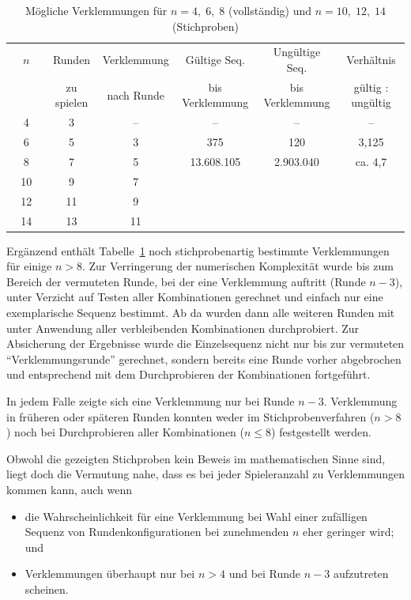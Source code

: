 \documentclass[DIV=15, 10pt]{scrartcl}
\begin{document}
\begin{table}[htbp]
\begin{center}
\begin{tabular}{cccccc}
\toprule
$\quad n \quad$ & Runden & Verklemmung & Gültige Seq. & Ungültige Seq. & Verhältnis\\
& zu spielen & nach Runde & bis Verklemmung & bis Verklemmung & gültig : ungültig\\[1mm]
\midrule
4 &  3 &  -- & -- & -- & -- \\[1mm]
6 &  5 &  3 & 375 & 120 & 3,125 \\[1mm]
8 &  7 &  5 & 13.608.105 & 2.903.040 & ca. 4,7 \\[1mm]
\midrule
10 & 9 & 7\\[1mm]
12 & 11 & 9\\[1mm]
14 & 13 & 11\\[1mm]
\bottomrule
\end{tabular}
\caption{Mögliche Verklemmungen für $n=4, \; 6, \; 8$ (vollständig) und $n=10, \; 12, \; 14$ (Stichproben)}
\label{tabDeadlock}
\end{center}
\end{table}

Ergänzend enthält Tabelle~\ref{tabDeadlock} noch stichprobenartig bestimmte Verklemmungen für einige $n > 8$. Zur Verringerung der numerischen Komplexität wurde bis zum Bereich der vermuteten Runde, bei der eine Verklemmung auftritt (Runde $n-3$), unter Verzicht auf Testen aller Kombinationen gerechnet und einfach nur eine exemplarische Sequenz bestimmt. Ab da wurden dann alle weiteren Runden mit unter Anwendung aller verbleibenden Kombinationen durchprobiert. Zur Absicherung der Ergebnisse wurde die Einzelsequenz nicht nur bis zur vermuteten "`Verklemmungsrunde"' gerechnet, sondern bereits eine Runde vorher abgebrochen und entsprechend mit dem Durchprobieren der Kombinationen fortgeführt.

In jedem Falle zeigte sich eine Verklemmung nur bei Runde $n-3$. Verklemmung in früheren oder späteren Runden konnten weder im Stichprobenverfahren ($n > 8$) noch bei Durchprobieren aller Kombinationen ($n \leq 8$) festgestellt werden.

Obwohl die gezeigten Stichproben kein Beweis im mathematischen Sinne sind, liegt doch die Vermutung nahe, dass es bei jeder Spieleranzahl zu Verklemmungen kommen kann, auch wenn

\begin{itemize}

\item die Wahrscheinlichkeit für eine Verklemmung bei Wahl einer zufälligen Sequenz von Rundenkonfigurationen bei zunehmenden $n$ eher geringer wird; und

\item Verklemmungen überhaupt nur bei $n > 4$ und bei Runde $n - 3$ aufzutreten scheinen.

\end{itemize}
\end{document}
